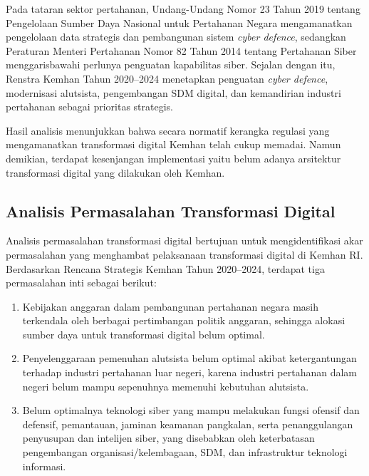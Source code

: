 Pada tataran sektor pertahanan, Undang-Undang Nomor 23 Tahun 2019 tentang Pengelolaan Sumber Daya Nasional untuk Pertahanan Negara mengamanatkan pengelolaan data strategis dan pembangunan sistem \textit{cyber defence}, sedangkan Peraturan Menteri Pertahanan Nomor 82 Tahun 2014 tentang Pertahanan Siber menggarisbawahi perlunya penguatan kapabilitas siber.
Sejalan dengan itu, Renstra Kemhan Tahun 2020--2024 menetapkan penguatan \textit{cyber defence}, modernisasi alutsista, pengembangan SDM digital, dan kemandirian industri pertahanan sebagai prioritas strategis.

Hasil analisis menunjukkan bahwa secara normatif kerangka regulasi yang mengamanatkan transformasi digital Kemhan telah cukup memadai. Namun demikian, terdapat kesenjangan implementasi yaitu belum adanya arsitektur transformasi digital yang dilakukan oleh Kemhan.

\subsection{Analisis Permasalahan Transformasi Digital}
Analisis permasalahan transformasi digital bertujuan untuk mengidentifikasi akar permasalahan yang menghambat pelaksanaan transformasi digital di Kemhan RI.
Berdasarkan Rencana Strategis Kemhan Tahun 2020--2024, terdapat tiga permasalahan inti sebagai berikut:
\begin{enumerate}
  \item Kebijakan anggaran dalam pembangunan pertahanan negara masih terkendala oleh berbagai pertimbangan politik anggaran, sehingga alokasi sumber daya untuk transformasi digital belum optimal.
  \item Penyelenggaraan pemenuhan alutsista belum optimal akibat ketergantungan terhadap industri pertahanan luar negeri, karena industri pertahanan dalam negeri belum mampu sepenuhnya memenuhi kebutuhan alutsista.
  \item Belum optimalnya teknologi siber yang mampu melakukan fungsi ofensif dan defensif, pemantauan, jaminan keamanan pangkalan, serta penanggulangan penyusupan dan intelijen siber, yang disebabkan oleh keterbatasan pengembangan organisasi/kelembagaan, SDM, dan infrastruktur teknologi informasi.
\end{enumerate}


